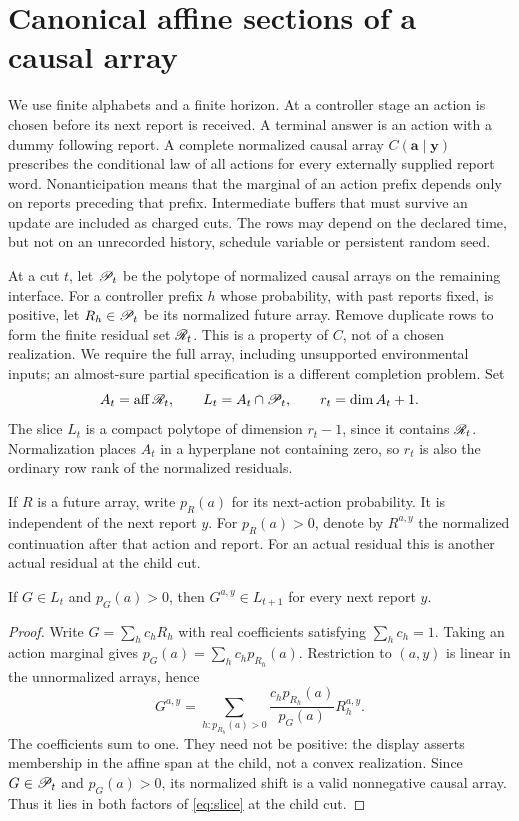 \section{Canonical affine sections of a causal array}
\label{sec:sections}
We use finite alphabets and a finite horizon. At a controller stage an
action is chosen before its next report is received. A terminal answer
is an action with a dummy following report. A complete normalized causal
array $C(\mathbf a\mid\mathbf y)$ prescribes the conditional law of all
actions for every externally supplied report word. Nonanticipation means
that the marginal of an action prefix depends only on reports preceding
that prefix. Intermediate buffers that must survive an update are included
as charged cuts. The rows may depend on the declared time, but not on an
unrecorded history, schedule variable or persistent random seed.

At a cut $t$, let $\mathscr P_t$ be the polytope of normalized causal arrays on
the remaining interface. For a controller prefix $h$ whose probability,
with past reports fixed, is positive, let $R_h\in\mathscr P_t$ be its normalized
future array. Remove duplicate rows to form the finite residual set
$\mathscr R_t$. This is a property of $C$, not of a chosen realization. We
require the full array, including unsupported environmental inputs; an
almost-sure partial specification is a different completion problem.
Set
\begin{equation}\label{eq:slice}
 A_t=\operatorname{aff}\mathscr R_t,\qquad L_t=A_t\cap\mathscr P_t,\qquad
 r_t=\dim A_t+1.
\end{equation}
The slice $L_t$ is a compact polytope of dimension $r_t-1$, since it
contains $\mathscr R_t$. Normalization places $A_t$ in a hyperplane not containing
zero, so $r_t$ is also the ordinary row rank of the normalized residuals.

If $R$ is a future array, write $p_R(a)$ for its next-action probability.
It is independent of the next report $y$. For $p_R(a)>0$, denote by
$R^{a,y}$ the normalized continuation after that action and report. For
an actual residual this is another actual residual at the child cut.

\begin{proposition}
\label{prop:slice-shift}
If $G\in L_t$ and $p_G(a)>0$, then $G^{a,y}\in L_{t+1}$ for every
next report $y$.
\end{proposition}
\begin{proof}
Write $G=\sum_h c_hR_h$ with real coefficients satisfying $\sum_hc_h=1$.
Taking an action marginal gives $p_G(a)=\sum_h c_hp_{R_h}(a)$. Restriction
to $(a,y)$ is linear in the unnormalized arrays, hence
\[
 G^{a,y}=\sum_{h:p_{R_h}(a)>0}
       \frac{c_hp_{R_h}(a)}{p_G(a)}R_h^{a,y}.
\]
The coefficients sum to one. They need not be positive: the display
asserts membership in the affine span at the child, not a convex
realization. Since $G\in\mathscr P_t$ and $p_G(a)>0$, its normalized shift
is a valid nonnegative causal array. Thus it lies in both factors
of \eqref{eq:slice} at the child cut.
\end{proof}


